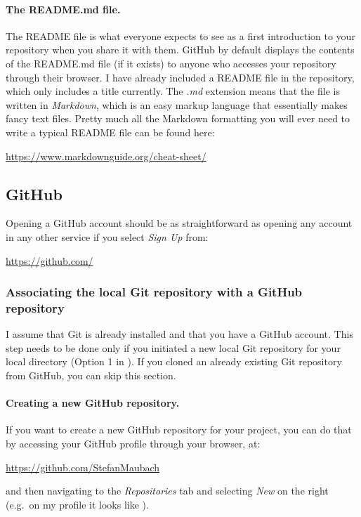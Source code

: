 \documentclass[a4paper,10pt]{article}
\begin{document}
\paragraph{The README.md file.} The README file is what everyone expects to see as a first introduction to your repository when you share it with them. GitHub by default displays the contents of the README.md file (if it exists) to anyone who accesses your repository through their browser. I have already included a README file in the repository, which only includes a title currently. The \emph{.md} extension means that the file is written in \emph{Markdown}, which is an easy markup language that essentially makes fancy text files. Pretty much all the Markdown formatting you will ever need to write a typical README file can be found here:

\url{https://www.markdownguide.org/cheat-sheet/}


\subsection{GitHub}

Opening a GitHub account should be as straightforward as opening any account in any other service if you select \emph{Sign Up} from: 

\url{https://github.com/}


\subsubsection{Associating the local Git repository with a GitHub repository}

I assume that Git is already installed and that you have a GitHub account. This step needs to be done only if you initiated a new local Git repository for your local directory (Option 1 in ). If you cloned an already existing Git repository from GitHub, you can skip this section.

\paragraph{Creating a new GitHub repository.} If you want to create a new GitHub repository for your project, you can do that by accessing your GitHub profile through your browser, at:

\url{https://github.com/StefanMaubach}

and then navigating to the \emph{Repositories} tab and selecting \emph{New} on the right (e.g.\ on my profile it looks like ).
\end{document}
